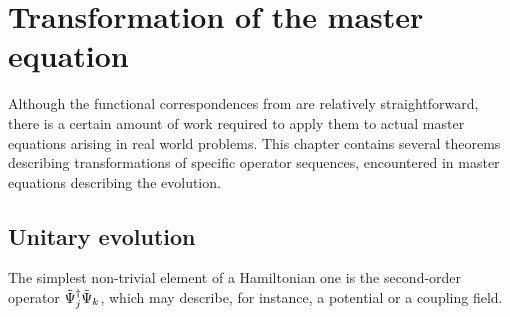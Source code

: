\chapter{Transformation of the master equation}
\label{cha:wigner-spec}

Although the functional correspondences from  are relatively straightforward, there is a certain amount of work required to apply them to actual master equations arising in real world problems.
This chapter contains several theorems describing transformations of specific operator sequences, encountered in master equations describing the  evolution.


\section{Unitary evolution}

The simplest non-trivial element of a Hamiltonian one is the second-order operator $\tilde{\Psi}_j^\dagger \tilde{\Psi}_k$, which may describe, for instance, a potential or a coupling field.

